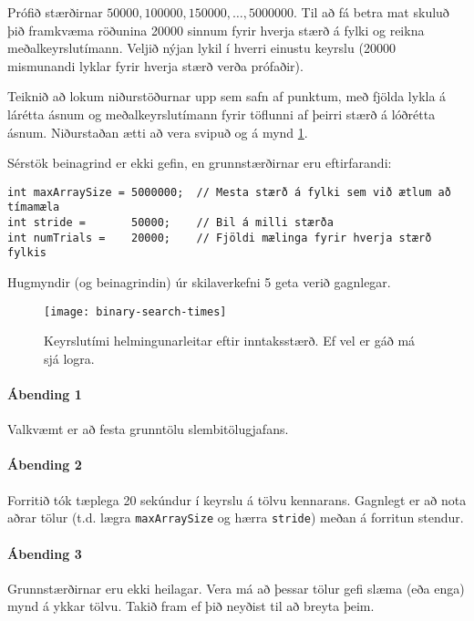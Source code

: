 \documentclass{article}
\begin{document}
Prófið stærðirnar $50000, 100000, 150000, \ldots , 5000000$. Til að fá betra mat skuluð þið framkvæma röðunina 20000 sinnum fyrir hverja stærð á fylki og reikna meðalkeyrslutímann. Veljið nýjan lykil í hverri einustu keyrslu (20000 mismunandi lyklar fyrir hverja stærð verða prófaðir).

Teiknið að lokum niðurstöðurnar upp sem safn af punktum, með fjölda lykla á lárétta ásnum og meðalkeyrslutímann fyrir töflunni af þeirri stærð á lóðrétta ásnum. Niðurstaðan ætti að vera svipuð og á mynd \ref{mynd:1}.

\newpage

Sérstök beinagrind er ekki gefin, en grunnstærðirnar eru eftirfarandi:

\begin{verbatim}
int maxArraySize = 5000000;  // Mesta stærð á fylki sem við ætlum að tímamæla
int stride =       50000;    // Bil á milli stærða
int numTrials =    20000;    // Fjöldi mælinga fyrir hverja stærð fylkis
\end{verbatim}

Hugmyndir (og beinagrindin) úr skilaverkefni 5 geta verið gagnlegar.

\begin{figure}[h]
	\caption{Keyrslutími helmingunarleitar eftir inntaksstærð. Ef vel er gáð má sjá logra.}
	\label{mynd:1}
	\begin{center}
		\texttt{[image: binary-search-times]}
	\end{center}
\end{figure}

\paragraph{Ábending 1} Valkvæmt er að festa grunntölu slembitölugjafans.
\paragraph{Ábending 2} Forritið tók tæplega 20 sekúndur í keyrslu á tölvu kennarans. Gagnlegt er að nota aðrar tölur (t.d. lægra \texttt{maxArraySize} og hærra \texttt{stride}) meðan á forritun stendur.
\paragraph{Ábending 3} Grunnstærðirnar eru ekki heilagar. Vera má að þessar tölur gefi slæma (eða enga) mynd á ykkar tölvu. Takið fram ef þið neyðist til að breyta þeim.
\end{document}
